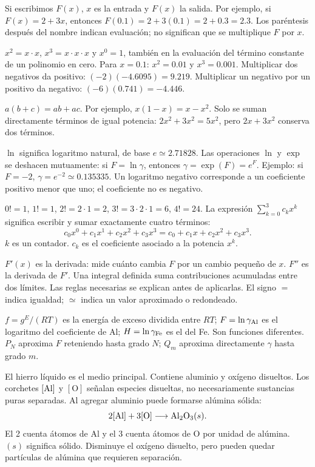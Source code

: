 Si escribimos $F(x)$, $x$ es la entrada y $F(x)$ la salida. Por ejemplo, si $F(x)=2+3x$, entonces $F(0.1)=2+3(0.1)=2+0.3=2.3$. Los paréntesis después del nombre indican evaluación; no significan que se multiplique $F$ por $x$.

$x^2=x\cdot x$, $x^3=x\cdot x\cdot x$ y $x^0=1$, también en la evaluación del término constante de un polinomio en cero. Para $x=0.1$: $x^2=0.01$ y $x^3=0.001$. Multiplicar dos negativos da positivo: $(-2)(-4.6095)=9.219$. Multiplicar un negativo por un positivo da negativo: $(-6)(0.741)=-4.446$.

$a(b+c)=ab+ac$. Por ejemplo, $x(1-x)=x-x^2$. Solo se suman directamente términos de igual potencia: $2x^2+3x^2=5x^2$, pero $2x+3x^2$ conserva dos términos.

$\ln$ significa logaritmo natural, de base $e\simeq2.71828$. Las operaciones $\ln$ y $\exp$ se deshacen mutuamente: si $F=\ln\gamma$, entonces $\gamma=\exp(F)=e^F$. Ejemplo: si $F=-2$, $\gamma=e^{-2}\simeq0.135335$. Un logaritmo negativo corresponde a un coeficiente positivo menor que uno; el coeficiente no es negativo.

$0!=1$, $1!=1$, $2!=2\cdot1=2$, $3!=3\cdot2\cdot1=6$, $4!=24$. La expresión $\sum_{k=0}^{3}c_kx^k$ significa escribir y sumar exactamente cuatro términos:
\[
c_0x^0+c_1x^1+c_2x^2+c_3x^3=c_0+c_1x+c_2x^2+c_3x^3.
\]
$k$ es un contador. $c_k$ es el coeficiente asociado a la potencia $x^k$.

$F'(x)$ es la derivada: mide cuánto cambia $F$ por un cambio pequeño de $x$. $F''$ es la derivada de $F'$. Una integral definida suma contribuciones acumuladas entre dos límites. Las reglas necesarias se explican antes de aplicarlas. El signo $=$ indica igualdad; $\simeq$ indica un valor aproximado o redondeado.

$f=g^E/(RT)$ es la energía de exceso dividida entre $RT$; $F=\ln\gamma_{\mathrm{Al}}$ es el logaritmo del coeficiente de Al; $H=\ln\gamma_{\mathrm{Fe}}$ es el del Fe. Son funciones diferentes. $P_N$ aproxima $F$ reteniendo hasta grado $N$; $Q_m$ aproxima directamente $\gamma$ hasta grado $m$.

El hierro líquido es el medio principal. Contiene aluminio y oxígeno disueltos. Los corchetes $[\mathrm{Al}]$ y $[\mathrm O]$ señalan especies disueltas, no necesariamente sustancias puras separadas. Al agregar aluminio puede formarse alúmina sólida:
\[
2[\mathrm{Al}]+3[\mathrm O]\longrightarrow\mathrm{Al}_2\mathrm O_3(s).
\]
El 2 cuenta átomos de Al y el 3 cuenta átomos de O por unidad de alúmina. $(s)$ significa sólido. Disminuye el oxígeno disuelto, pero pueden quedar partículas de alúmina que requieren separación.

